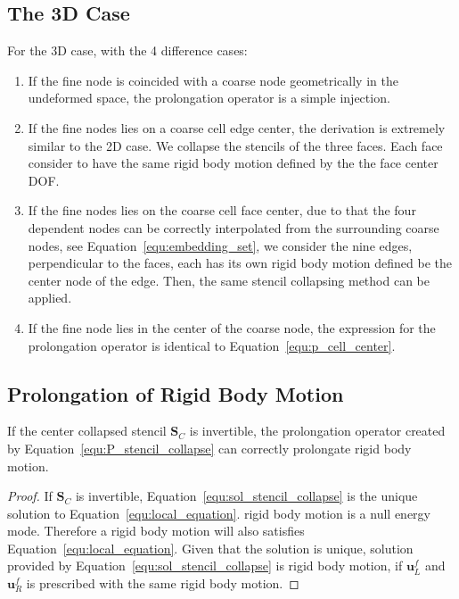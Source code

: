 \subsection{The 3D Case}
For the 3D case, with the 4 difference cases:
\begin{enumerate}
\item If the fine node is coincided with a coarse node geometrically in the undeformed space, the prolongation operator is a simple injection. 
\item If the fine nodes lies on a coarse cell edge center, the derivation is extremely similar to the 2D case. We collapse the stencils of the three faces. Each face consider to have the same rigid body motion defined by the the face center DOF.
\item If the fine nodes lies on the coarse cell face center, due to that the four dependent nodes can be correctly interpolated from the surrounding coarse nodes, see Equation~\ref {equ:embedding_set}, we consider the nine edges, perpendicular to the faces, each has its own rigid body motion defined be the center node of the edge. Then, the same stencil collapsing method can be applied.
\item If the fine node lies in the center of the coarse node, the expression for the prolongation operator is identical to Equation~\ref{equ:p_cell_center}. 
\end{enumerate}
\subsection{Prolongation of Rigid Body Motion}
\begin{lem}If the center collapsed stencil $\mathbf{S}_C$ is invertible, the prolongation operator created by Equation~\ref{equ:P_stencil_collapse} can correctly prolongate rigid body motion.\end{lem}
\begin{proof}
If $\mathbf{S}_C$ is invertible, Equation~\ref{equ:sol_stencil_collapse} is the unique solution to Equation~\ref{equ:local_equation}. rigid body motion is a null energy mode. Therefore a rigid body motion will also satisfies Equation~\ref{equ:local_equation}. Given that the solution is unique, solution provided by Equation~\ref{equ:sol_stencil_collapse} is rigid body motion, if $\mathbf{u}^f_{L}$ and $\mathbf{u}^f_{R}$ is prescribed with the same rigid body motion.
\end{proof}